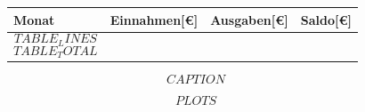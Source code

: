 

\vspace{0cm}

\begin{figure}[h!]
    \footnotesize
    \centering
    \captionsetup{labelformat=empty}
    \caption{$$CAPTION$$}
    \begin{tabular}{l r r r}
        Monat&Einnahmen[€]&Ausgaben[€]&Saldo[€]\\
        \hline
        \hline
        $$TABLE_LINES$$
        \hline
        $$TABLE_TOTAL$$
    \end{tabular}
\end{figure}

$$PLOTS$$

\clearpage